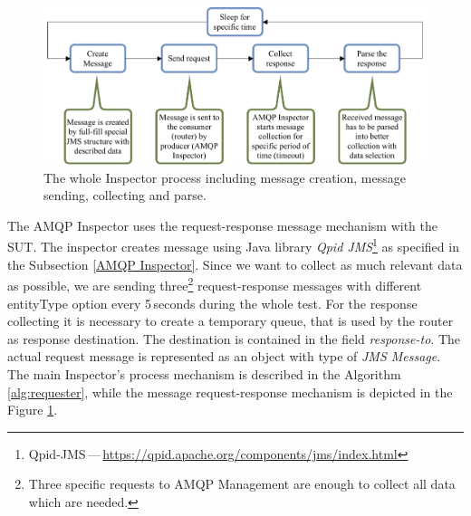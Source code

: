 \begin{figure}[H]
  \centering
  \includegraphics[width=15cm]{obrazky-figures/inspector_collector.pdf}
  \caption{The whole Inspector process including message creation, message sending, collecting and parse.}
  \label{fig:collector}
\end{figure}


The AMQP Inspector uses the request-response message mechanism with the SUT. The inspector creates message using Java library \emph{Qpid JMS}\footnote{Qpid-JMS\,---\,\url{https://qpid.apache.org/components/jms/index.html}} as specified in the Subsection \ref{AMQP Inspector}. Since we want to collect as much relevant data as possible, we are sending three\footnote{Three specific requests to AMQP Management are enough to collect all data which are needed.} request-response messages with different entityType option every 5\,seconds during the whole test. For the response collecting it is necessary to create a temporary queue, that is used by the router as response destination. The destination is contained in the field \emph{response-to}. The actual request message is represented as an object with type of \emph{JMS Message}. The main Inspector's process mechanism is described in the Algorithm \ref{alg:requester}, while the message request-response mechanism is depicted in the Figure \ref{fig:collector}.
